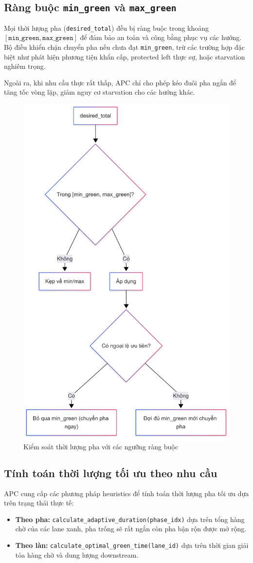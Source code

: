 \subsection{Ràng buộc \texttt{min\_green} và \texttt{max\_green}}

Mọi thời lượng pha (\texttt{desired\_total}) đều bị ràng buộc trong khoảng \([\texttt{min\_green}, \texttt{max\_green}]\) để đảm bảo an toàn và công bằng phục vụ các hướng. Bộ điều khiển chặn chuyển pha nếu chưa đạt \texttt{min\_green}, trừ các trường hợp đặc biệt như phát hiện phương tiện khẩn cấp, protected left thực sự, hoặc starvation nghiêm trọng.

Ngoài ra, khi nhu cầu thực rất thấp, APC chỉ cho phép kéo đuôi pha ngắn để tăng tốc vòng lặp, giảm nguy cơ starvation cho các hướng khác.

\begin{figure}[H]
    \centering
    \includegraphics[width=0.5\linewidth]{Untitled diagram _ Mermaid Chart-2025-08-26-091434.png}
    \caption{Kiểm soát thời lượng pha với các ngưỡng ràng buộc}
    \label{fig:minmax_constraints}
\end{figure}
\subsection{Tính toán thời lượng tối ưu theo nhu cầu}

APC cung cấp các phương pháp heuristics để tính toán thời lượng pha tối ưu dựa trên trạng thái thực tế:
\begin{itemize}
    \item \textbf{Theo pha:} \texttt{calculate\_adaptive\_duration(phase\_idx)} dựa trên tổng hàng chờ của các lane xanh, pha trống sẽ rất ngắn còn pha bận rộn được mở rộng.
    \item \textbf{Theo làn:} \texttt{calculate\_optimal\_green\_time(lane\_id)} dựa trên thời gian giải tỏa hàng chờ và dung lượng downstream.
\end{itemize}

